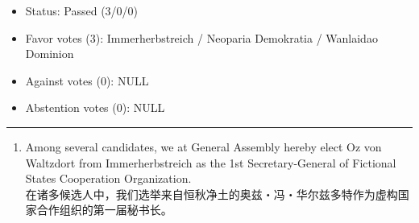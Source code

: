



\begin{itemize}
	\item Status: Passed (3/0/0)
	\item Favor votes (3): Immerherbstreich / Neoparia Demokratia / Wanlaidao Dominion
	\item Against votes (0): NULL
	\item Abstention votes (0): NULL
\end{itemize}

\hrule

\begin{enumerate}
	\item Among several candidates, we at General Assembly hereby elect
	      Oz von Waltzdort from Immerherbstreich as the 1st Secretary-General of Fictional States Cooperation Organization.\\
	      在诸多候选人中，我们选举来自恒秋净土的奥兹・冯・华尔兹多特作为虚构国家合作组织的第一届秘书长。
\end{enumerate}



